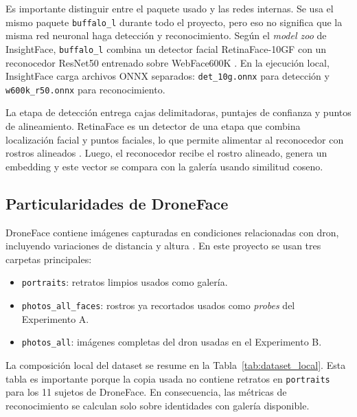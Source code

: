 \documentclass[11pt]{article}
\begin{document}
Es importante distinguir entre el paquete usado y las redes internas. Se usa el mismo paquete \texttt{buffalo\_l} durante todo el proyecto, pero eso no significa que la misma red neuronal haga detección y reconocimiento. Según el \textit{model zoo} de InsightFace, \texttt{buffalo\_l} combina un detector facial RetinaFace-10GF con un reconocedor ResNet50 entrenado sobre WebFace600K \cite{insightface_model_zoo}. En la ejecución local, InsightFace carga archivos ONNX separados: \texttt{det\_10g.onnx} para detección y \texttt{w600k\_r50.onnx} para reconocimiento.

La etapa de detección entrega cajas delimitadoras, puntajes de confianza y puntos de alineamiento. RetinaFace es un detector de una etapa que combina localización facial y puntos faciales, lo que permite alimentar al reconocedor con rostros alineados \cite{deng2020retinaface}. Luego, el reconocedor recibe el rostro alineado, genera un embedding y este vector se compara con la galería usando similitud coseno.

\subsection{Particularidades de DroneFace}

DroneFace contiene imágenes capturadas en condiciones relacionadas con dron, incluyendo variaciones de distancia y altura \cite{hsu2017droneface}. En este proyecto se usan tres carpetas principales:

\begin{itemize}
    \item \texttt{portraits}: retratos limpios usados como galería.
    \item \texttt{photos\_all\_faces}: rostros ya recortados usados como \textit{probes} del Experimento A.
    \item \texttt{photos\_all}: imágenes completas del dron usadas en el Experimento B.
\end{itemize}

La composición local del dataset se resume en la Tabla~\ref{tab:dataset_local}. Esta tabla es importante porque la copia usada no contiene retratos en \texttt{portraits} para los 11 sujetos de DroneFace. En consecuencia, las métricas de reconocimiento se calculan solo sobre identidades con galería disponible.
\end{document}
